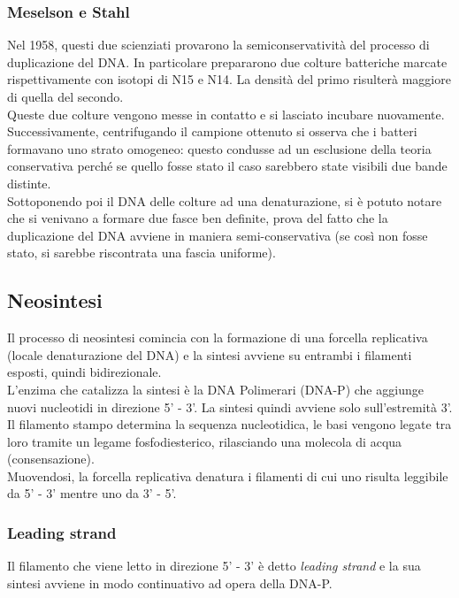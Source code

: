         \subsubsection{Meselson e Stahl}
            Nel 1958, questi due scienziati provarono la semiconservatività del processo di duplicazione del DNA. In particolare prepararono due colture batteriche marcate rispettivamente con isotopi di N15 e N14. La densità del primo risulterà maggiore di quella del secondo.\\
            Queste due colture vengono messe in contatto e si lasciato incubare nuovamente. Successivamente, centrifugando il campione ottenuto si osserva che i batteri formavano uno strato omogeneo: questo condusse ad un esclusione della teoria conservativa perché se quello fosse stato il caso sarebbero state visibili due bande distinte.\\
            Sottoponendo poi il DNA delle colture ad una denaturazione, si è potuto notare che si venivano a formare due fasce ben definite, prova del fatto che la duplicazione del DNA avviene in maniera semi-conservativa (se così non fosse stato, si sarebbe riscontrata una fascia uniforme).
        
        \subsection{Neosintesi}
            Il processo di neosintesi comincia con la formazione di una forcella replicativa (locale denaturazione del DNA) e la sintesi avviene su entrambi i filamenti esposti, quindi bidirezionale. \\
            L'enzima che catalizza la sintesi è la DNA Polimerari (DNA-P) che aggiunge nuovi nucleotidi in direzione 5' - 3'. La sintesi quindi avviene solo sull'estremità 3'.\\
            Il filamento stampo determina la sequenza nucleotidica, le basi vengono legate tra loro tramite un legame fosfodiesterico, rilasciando una molecola di acqua (consensazione).\\
            Muovendosi, la forcella replicativa denatura i filamenti di cui uno risulta leggibile da 5' - 3' mentre uno da 3' - 5'.
            \subsubsection{Leading strand}
                Il filamento che viene letto in direzione 5' - 3' è detto \textit{leading strand} e la sua sintesi avviene in modo continuativo ad opera della DNA-P.
            

